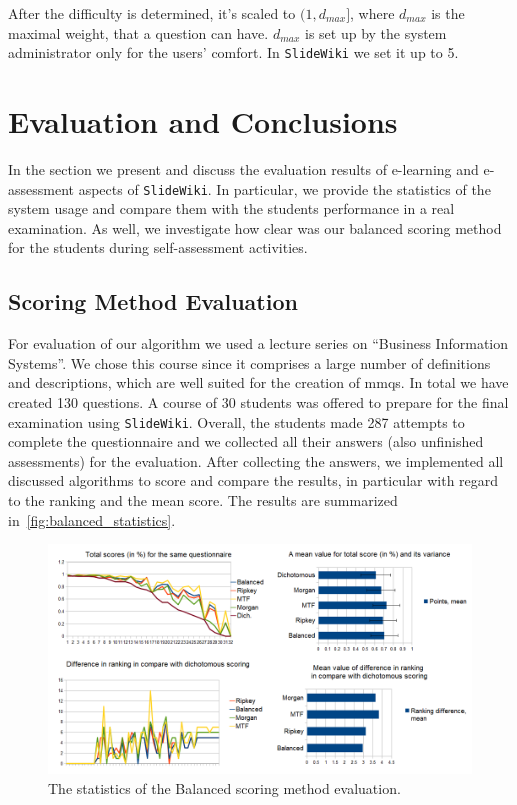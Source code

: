 \documentclass[PhD, Submit, ngerman,UKenglish,table]{scrbook}
\begin{document}
After the difficulty is determined, it's scaled to $(1,d_{max}]$, where $d_{max}$ is the maximal weight, that a question can have.
$d_{max}$ is set up by the system administrator only for the users' comfort.
In \texttt{SlideWiki} we set it up to 5.

\section{Evaluation and Conclusions}

In the section we present and discuss the evaluation results of e-learning and e-assessment aspects of \texttt{SlideWiki}.
In particular, we provide the statistics of the system usage and compare them with the students performance in a real examination.
As well, we investigate how clear was our balanced scoring method for the students during self-assessment activities. 

\subsection{Scoring Method Evaluation}

For evaluation of our algorithm we used a lecture series on ``Business Information Systems''. 
We chose this course since it comprises a large number of definitions and descriptions, which are well suited for the creation of \gls{mmq}s. 
In total we have created 130 questions.
A course of 30 students was offered to prepare for the final examination using \texttt{SlideWiki}.
Overall, the students made 287 attempts to complete the questionnaire and we collected all their answers (also unfinished assessments) for the evaluation.
After collecting the answers, we implemented all discussed algorithms to score  and compare the results, in particular with regard to the ranking and the mean score.
The results are summarized in~\autoref{fig:balanced_statistics}.

\begin{figure}[t!]
	\centering
		\includegraphics[width=\textwidth]{images/statistics.png}
	\caption{The statistics of the Balanced scoring method evaluation.}
	\label{fig:balanced_statistics}
\end{figure}
\end{document}
